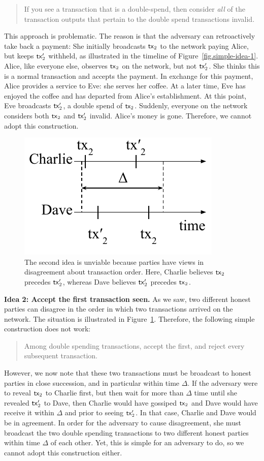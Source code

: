 \begin{quote}
If you see a transaction that is a double-spend,
then consider \emph{all} of the transaction outputs that pertain to the double spend transactions invalid.
\end{quote}

This approach is problematic. The reason is that the adversary can retroactively take back
a payment: She initially broadcasts $\mathsf{tx}_2$ to the network paying Alice, but keeps $\mathsf{tx}_2'$ withheld,
as illustrated in the timeline of Figure~\ref{fig.simple-idea-1}.
Alice, like everyone else, observes $\mathsf{tx}_2$ on the network, but not $\mathsf{tx}_2'$. She thinks this is
a normal transaction and accepts the payment. In exchange for this payment, Alice provides a service
to Eve: she serves her coffee. At a later time, Eve has enjoyed the coffee and has departed from Alice's
establishment. At this point, Eve broadcasts $\mathsf{tx}_2'$, a double spend of $\mathsf{tx}_2$. Suddenly, everyone
on the network considers both $\mathsf{tx}_2$ and $\mathsf{tx}_2'$ invalid. Alice's money is gone. Therefore, we cannot
adopt this construction.

\begin{figure}[h]
    \centering
    \includegraphics[width=0.325 \columnwidth,keepaspectratio]{figures/simple-idea-2.pdf}
    \caption{The second idea is unviable because parties
    have views in disagreement about transaction order. Here, Charlie believes $\mathsf{tx}_2$
    precedes $\mathsf{tx}_2'$, whereas Dave believes $\mathsf{tx}_2'$ precedes $\mathsf{tx}_2$.}
    \label{fig.simple-idea-2}
\end{figure}

\noindent
\textbf{Idea 2: Accept the first transaction seen.} As we saw, two different honest parties can disagree in
the order in which two transactions arrived on the network. The situation is illustrated in
Figure~\ref{fig.simple-idea-2}. Therefore, the following simple construction does not work:

\begin{quote}
  Among double spending transactions, accept the first, and reject every subsequent transaction.
\end{quote}

However, we now note that these two transactions must be broadcast
to honest parties in close succession, and in particular within time $\Delta$. If the adversary
were to reveal $\mathsf{tx}_2$ to Charlie first, but then wait for more than $\Delta$ time until she revealed
$\mathsf{tx}_2'$ to Dave, then Charlie would have gossiped $\mathsf{tx}_2$ and Dave would have receive it within $\Delta$
and prior to seeing $\mathsf{tx}_2'$. In that case, Charlie and Dave would be in agreement.
In order for the adversary to cause disagreement, she must broadcast the two double spending
transactions to two different honest parties within time $\Delta$ of each other. Yet, this is
simple for an adversary to do, so we cannot adopt this construction either.

